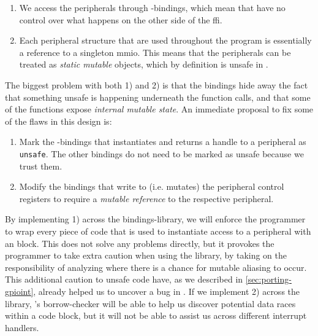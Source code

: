 \begin{enumerate}[\hspace{13}1)]
    \item We access the peripherals through {\C}-bindings, which mean that {\rust} have no control over what happens on the other side of the \gls{ffi}.

    \item Each peripheral structure that are used throughout the program is essentially a reference to a singleton \gls{mmio}.
    This means that the peripherals can be treated as \emph{static mutable} objects, which by definition is unsafe in {\rust}.

\end{enumerate}

The biggest problem with both 1) and 2) is that the bindings hide away the fact that something unsafe is happening underneath the function calls, and that some of the functions expose \emph{internal mutable state}.
An immediate proposal to fix some of the flaws in this design is:

\begin{enumerate}[\hspace{13}1)]
    \item Mark the {\rust}-bindings that instantiates and returns a handle to a peripheral as \texttt{unsafe}.
    The other bindings do not need to be marked as unsafe because we trust them.

    \item Modify the bindings that write to (i.e. mutates) the peripheral control registers to require a \emph{mutable reference} to the respective peripheral.
\end{enumerate}

By implementing 1) across the bindings-library, we will enforce the programmer to wrap every piece of code that is used to instantiate access to a peripheral with an  block.
This does not solve any problems directly, but it provokes the programmer to take extra caution when using the library, by taking on the responsibility of analyzing where there is a chance for mutable aliasing to occur.
This additional caution to unsafe code have, as we described in \autoref{sec:porting-gpioint}, already helped us to uncover a bug in .
If we implement 2) across the library, {\rust}'s borrow-checker will be able to help us discover potential data races within a code block, but it will not be able to assist us across different interrupt handlers.

